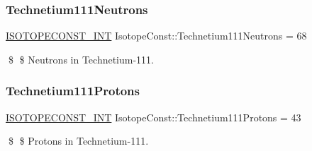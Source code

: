 \subsubsection{\texorpdfstring{Technetium111\+Neutrons}{Technetium111Neutrons}}
{\footnotesize\ttfamily \mbox{\hyperlink{group___isotope_const-_macros_ga5f18360b3e99483a35c32d789e62621c}{I\+S\+O\+T\+O\+P\+E\+C\+O\+N\+S\+T\+\_\+\+I\+NT}} Isotope\+Const\+::\+Technetium111\+Neutrons = 68}

\$ \$ Neutrons in Technetium-\/111. \mbox{\label{group___isotope_const-_technetium-_tc111_ga7a9097968aa27e50d4ea9c1d2d697884}} 
\subsubsection{\texorpdfstring{Technetium111\+Protons}{Technetium111Protons}}
{\footnotesize\ttfamily \mbox{\hyperlink{group___isotope_const-_macros_ga5f18360b3e99483a35c32d789e62621c}{I\+S\+O\+T\+O\+P\+E\+C\+O\+N\+S\+T\+\_\+\+I\+NT}} Isotope\+Const\+::\+Technetium111\+Protons = 43}

\$ \$ Protons in Technetium-\/111. 